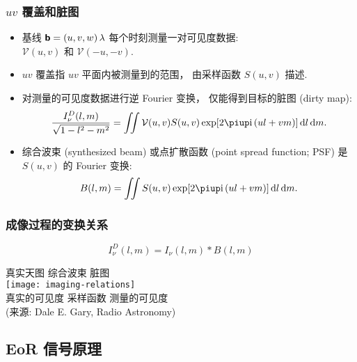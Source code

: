 \documentclass{beamer}
\begin{document}
\begin{frame}[subsec]
  \frametitle{$uv$ 覆盖和脏图}
  \begin{itemize}
    \item 基线 $\bm{\mathsf{b}} = (u,v,w) \,\lambda$ 每个时刻测量一对可见度数据: \\
      $\mathcal{V}(u,v)$ 和 $\mathcal{V}(-u,-v)$.
    \item \alert{$uv$ 覆盖}指 $uv$ 平面内被测量到的范围，
      由\alert{采样函数} $S(u,v)$ 描述.
    \item 对测量的可见度数据进行逆 Fourier 变换，
      仅能得到目标的\alert{脏图 (dirty map)}:
      \begin{equation}
        \frac{I_{\nu}^D(l,m)}{\sqrt{1-l^2-m^2}}
          = \iint \mathcal{V}(u,v) S(u,v)
            \exp [2\Cpi\Ci\, (ul+vm)] \,\D{l}\,\D{m}.
      \end{equation}
    \item \alert{综合波束 (synthesized beam)}
      或\alert{点扩散函数 (point spread function; PSF)}
      是 $S(u,v)$ 的 Fourier 变换:
      \begin{equation}
        B(l,m) = \iint S(u,v) \exp [2\Cpi\Ci\, (ul+vm)] \,\D{l}\,\D{m}.
      \end{equation}
  \end{itemize}
\end{frame}

\begin{frame}[subsec]
  \frametitle{成像过程的变换关系}
  \vspace{-1ex}
  \begin{equation}
    I_{\nu}^D(l,m) = I_{\nu}(l,m) * B(l,m)
  \end{equation}
  \begin{center}
    \footnotesize\noindent
    真实天图 \hspace{4em} 综合波束 \hspace{4.5em} 脏图 \\
    \texttt{[image: imaging-relations]} \\
    真实的可见度 \hspace{2.5em} 采样函数 \hspace{3em} 测量的可见度 \\
    (来源: Dale E. Gary, Radio Astronomy)
  \end{center}
\end{frame}

\subsection{EoR 信号原理}
\end{document}
